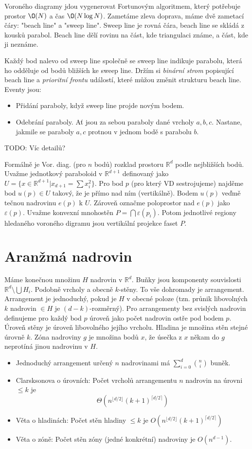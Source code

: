 \documentclass[a4paper,10pt,titlepage]{article} \usepackage[utf8]{inputenc}
\def\R{\mathbb{R}}
\begin{document}
Voroného diagramy jdou vygenerovat Fortunovým algoritmem, který potřebuje
prostor $\O(N)$ a čas $\O(N\log N)$. Zametáme zleva
doprava, máme dvě zametací čáry: "beach line" a "sweep line".
Sweep line je rovná čára, beach line se skládá z kousků parabol.
Beach line dělí rovinu na část, kde triangulaci známe, a část, kde ji neznáme.

Každý bod nalevo od sweep line společně se sweep line indikuje parabolu,
která ho odděluje od bodů bližších ke sweep line.
Držím si \emph{binární strom} popisující beach line a \emph{prioritní frontu}
událostí, které můžou změnit strukturu beach line.
Eventy jsou:
\begin{itemize}
\item Přidání paraboly, když sweep line projde novým bodem.
\item Odebrání paraboly. Ať jsou za sebou paraboly dané vrcholy $a,b,c$.
Nastane, jakmile se paraboly $a,c$ protnou v jednom bodě s parabolu $b$.
\end{itemize}

TODO: Víc detailů?

Formálně je Vor. diag. (pro $n$ bodů) rozklad prostoru $\R^d$ podle nejbližších bodů.
Uvažme jednotkový paraboloid v $\R^{d+1}$ definovaný jako $U=\{x\in \R^{d+1} | x_{d+1} = \sum x_i^2\}$.
Pro bod $p$ (pro který VD sestrojujeme) najděme bod $u(p) \in U$ takový, že je
přímo nad ním (vertikálně). Bodem $u(p)$ veďmě tečnou nadrovinu $e(p)$ k $U$.
Zároveň označme poloprostor nad $e(p)$ jako $\varepsilon(p)$. Uvažme konvexní 
mnohostěn $P = \bigcap \varepsilon(p_i)$. Potom jednotlivé regiony hledaného
voroného digramu jsou vertikální projekce faset $P$.

\section{Aranžmá nadrovin}
Máme konečnou množinu $H$ nadrovin v $\R^d$. Buňky jsou komponenty souvislosti
$\R^d \setminus \bigcup H_i$. Podobně vrcholy a obecně $k$-stěny. To vše dohromady
je arrangement. Arrangement je jednoduchý, pokud je $H$ v obecné poloze (tzn. průnik
libovolných $k$ nadrovin $\in H$ je $(d-k)$-rozměrný). Pro arrangementy bez svislých
nadrovin definujeme pro každý bod $p$ úroveň jako počet nadrovin ostře pod bodem $p$.
Úroveň stěny je úroveň libovolného jejího vrcholu. Hladina je množina stěn stejné
úrovně $k$. Zóna nadroviny $g$ je množina bodů $x$, že úsečka z $x$ někam do $g$
neprotíná jinou nadrovinu v $H$.

\begin{itemize}
\item Jednoduchý arrangement určený $n$ nadrovinami má $\sum\limits_{i=0}^d {n \choose i}$
buněk.
\item Clarsksonova o úrovních: Počet vrcholů arrangementu $n$ nadrovin na úrovni $\leq k$
je $$\Theta(n^{\lfloor d/2 \rfloor} (k+1)^{\lceil d/2 \rceil})$$
\item Věta o hladinách: Počet stěn hladiny $\leq k$ je \quad
$O(n^{\lfloor d/2 \rfloor} (k+1)^{\lceil d/2 \rceil})$
\item Věta o zóně: Počet stěn zóny (jedné konkrétní) nadroviny je $O(n^{d-1})$.
\end{itemize}
\end{document}
